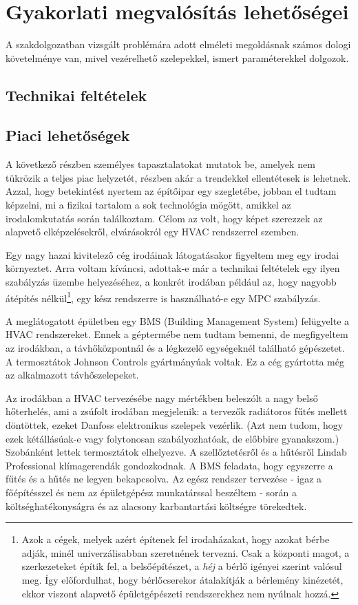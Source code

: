 \chapter{Gyakorlati megvalósítás lehetőségei}

A szakdolgozatban vizsgált problémára adott elméleti megoldásnak számos dologi követelménye van, mivel vezérelhető szelepekkel, ismert paraméterekkel dolgozok. 

\section{Technikai feltételek}\label{chap:feasibility-tech}


\section{Piaci lehetőségek}

A következő részben személyes tapasztalatokat mutatok be, amelyek nem tükrözik a teljes piac helyzetét, részben akár a trendekkel ellentétesek is lehetnek. Azzal, hogy betekintést nyertem az építőipar egy szegletébe, jobban el tudtam képzelni, mi a fizikai tartalom a sok technológia mögött, amikkel az irodalomkutatás során találkoztam. Célom az volt, hogy képet szerezzek az alapvető elképzelésekről, elvárásokról egy HVAC rendszerrel szemben.

Egy nagy hazai kivitelező cég irodáinak látogatásakor figyeltem meg egy irodai környeztet. Arra voltam kíváncsi, adottak-e már a technikai feltételek egy ilyen szabályzás üzembe helyezéséhez, a konkrét irodában például az, hogy nagyobb átépítés nélkül\footnote{Azok a cégek, melyek azért építenek fel irodaházakat, hogy azokat bérbe adják, minél univerzálisabban szeretnének tervezni. Csak a központi magot, a szerkezeteket építik fel, a belsőépítészet, a \textit{héj} a bérlő igényei szerint valósul meg. Így előfordulhat, hogy bérlőcserekor átalakítják a bérlemény kinézetét, ekkor viszont alapvető épületgépészeti rendszerekhez nem nyúlnak hozzá.}, egy kész rendszerre is használható-e egy MPC szabályzás.

A meglátogatott épületben egy BMS (Building Management System) felügyelte a HVAC rendszereket. Ennek a géptermébe nem tudtam bemenni, de megfigyeltem az irodákban, a távhőközpontnál és a légkezelő egységeknél található gépészetet. A termosztátok Johnson Controls gyártmányúak voltak. Ez a cég gyártotta még az alkalmazott távhőszelepeket.

Az irodákban a HVAC tervezésébe nagy mértékben beleszólt a nagy belső hőterhelés, ami a zsúfolt irodában megjelenik: a tervezők radiátoros fűtés mellett döntöttek, ezeket Danfoss elektronikus szelepek vezérlik. (Azt nem tudom, hogy ezek kétállásúak-e vagy folytonosan szabályozhatóak, de előbbire gyanakszom.) Szobánként lettek termosztátok elhelyezve. A szellőztetésről és a hűtésről Lindab Professional klímagerendák gondozkodnak. A BMS feladata, hogy egyszerre a fűtés és a hűtés ne legyen bekapcsolva. Az egész rendszer tervezése - igaz a főépítésszel és nem az épületgépész munkatárssal beszéltem - során a költséghatékonyságra és az alacsony karbantartási költségre törekedtek.

